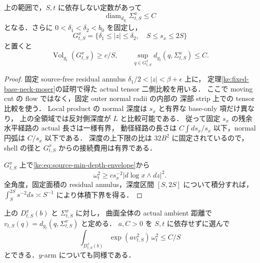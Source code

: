\begin{lemma}
\label{ke:source-scale-shell-good-set}
上の範囲で，$S,t$ に依存しない定数があって
\[
 \operatorname{diam}_{d_{g_t}}\Sigma^x_{t,S}\le C
\]
となる．さらに $0<\delta_1<\delta_2<b_0$ を固定し，
\[
 G^x_{t,S}
  =\{\delta_1\le|z|\le\delta_2,\quad S\le s_x\le2S\}
\]
と置くと
\begin{equation}\label{ke:eq:source-scale-good-set}
 \operatorname{Vol}_{g_t}(G^x_{t,S})\ge c/S,
 \qquad
 \sup_{q\in G^x_{t,S}}d_{g_t}(q,\Sigma^x_{t,S})\le C.
\end{equation}
\end{lemma}

\begin{proof}
固定 source-free residual annulus
$\delta_1/2<|z|<\beta+\epsilon$ 上に，
定理\ref{ke:fixed-base-neck-moser}の証明で得た actual tensor 二側比較を用いる．
ここで moving cut の flow ではなく，固定 outer normal radii の内部の
深部 strip 上での tensor 比較を使う．
Local product の normal 深度は $s_x$ と有界な base-only 項だけ異なり，
上の全領域では反対側深度が $L$ と比較可能である．
従って固定 $s_x$ の残余水平経路の actual 長さは一様有界，
動径経路の長さは $C\int ds_x/s_x$ 以下，normal 円弧は $C/s_x$ 以下である．
深度の上下限の比は $32B^2$ に固定されているので，shell の径と
$G^x_{t,S}$ からの接続費用は有界である．

$G^x_{t,S}$ 上で\eqref{ke:eq:source-min-depth-envelope}から
\[
 \omega_t^2\ge c s_x^{-2}|d\log x\wedge dz|^2.
\]
全角度，固定面積の residual annulus，深度区間 $[S,2S]$ について積分すれば，
$\int_S^{2S}s^{-2}ds\asymp S^{-1}$ により体積下界を得る．
\end{proof}

\begin{proposition}
\label{ke:source-scaled-arm-gaussian-tail}
上の $D^x_{t,S}(b)$ と $\Sigma^x_{t,S}$ に対し，
曲面全体の actual ambient 距離で
$v_{t,S}(q)=d_{g_t}(q,\Sigma^x_{t,S})$ と定める．
$a,C>0$ を $S,t$ に依存せずに選んで
\begin{equation}\label{ke:eq:source-scaled-arm-gaussian-tail}
 \int_{D^x_{t,S}(b)}\exp(a v_{t,S}^2)\,\omega_t^2\le C/S
\end{equation}
とできる．$y$-arm についても同様である．
\end{proposition}

